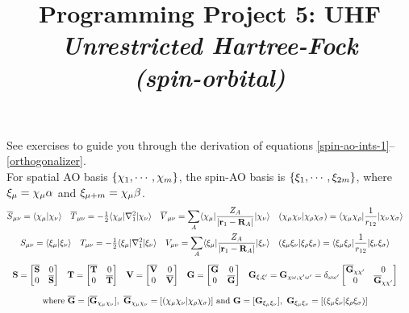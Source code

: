 \documentclass[fleqn]{article}
\title{Programming Project 5: UHF\\
\textit{Unrestricted Hartree-Fock\\(spin-orbital)}}
\author{}
\date{}
\begin{document}
\maketitle
\vspace{-1cm}
\noindent
See exercises to guide you through the derivation of equations \ref{spin-ao-ints-1}--\ref{orthogonalizer}.\\

\noindent
{}
For spatial AO basis $\{\chi_1,\cdots,\chi_m\}$, the spin-AO basis is $\{\xi_1,\cdots,\xi_{2m}\}$, where $\xi_\mu=\chi_\mu\alpha$ and $\xi_{\mu+m}=\chi_\mu\beta$.
\begin{gather}
\begin{aligned}
\label{space-ao-ints}
&
  \overline{S}_{\mu\nu}
=
  \langle\chi_{\mu}|\chi_{\nu}\rangle
&&
  \overline{T}_{\mu\nu}
=
  -\tfrac{1}{2}\langle\chi_{\mu}|\nabla_1^2|\chi_{\nu}\rangle
&&
  \overline{V}_{\mu\nu}
=
  \sum_A\langle\chi_{\mu}|\dfrac{Z_A}{|\mathbf{r}_1-\mathbf{R}_A|}|\chi_{\nu}\rangle
&&
  (\chi_\mu\chi_\nu|\chi_\rho\chi_\sigma)
=
  \langle\chi_\mu\chi_\rho|\dfrac{1}{r_{12}}|\chi_\nu\chi_\sigma\rangle
\end{aligned}\\
\begin{aligned}
\label{spin-ao-ints}
&
  S_{\mu\nu}
=
  \langle\xi_{\mu}|\xi_{\nu}\rangle
&&
  T_{\mu\nu}
=
  -\tfrac{1}{2}\langle\xi_{\mu}|\nabla_1^2|\xi_{\nu}\rangle
&&
  V_{\mu\nu}
=
  \sum_A\langle\xi_{\mu}|\dfrac{Z_A}{|\mathbf{r}_1-\mathbf{R}_A|}|\xi_{\nu}\rangle
&&
  (\xi_\mu\xi_\nu|\xi_\rho\xi_\sigma)
=
  \langle\xi_\mu\xi_\rho|\dfrac{1}{r_{12}}|\xi_\nu\xi_\sigma\rangle
\end{aligned}\\[5pt]
\begin{aligned}
\label{spin-ao-ints-1}
&
  \mathbf{S}
=
  \begin{bmatrix}\overline{\mathbf{S}}&0\\0&\overline{\mathbf{S}}\end{bmatrix}
&&
  \mathbf{T}
=
  \begin{bmatrix}\overline{\mathbf{T}}&0\\0&\overline{\mathbf{T}}\end{bmatrix}
&&
  \mathbf{V}
=
  \begin{bmatrix}\overline{\mathbf{V}}&0\\0&\overline{\mathbf{V}}\end{bmatrix}
&&
  \mathbf{G}
=
  \begin{bmatrix}\overline{\mathbf{G}}&0\\0&\overline{\mathbf{G}}\end{bmatrix}
&&
  \mathbf{G}_{\xi,\xi'}
=
  \mathbf{G}_{\chi\omega,\chi'\omega'}
=
  \delta_{\omega\omega'}
  \begin{bmatrix}\overline{\mathbf{G}}_{\chi\chi'}&0\\0&\overline{\mathbf{G}}_{\chi\chi'}\end{bmatrix}
\end{aligned}\\[7pt]
\begin{aligned}
\label{spin-ao-ints-2}
&
\text{where}
\
  \overline{\mathbf{G}}
=
  [\overline{\mathbf{G}}_{\chi_\mu\chi_\nu}],
\
  \overline{\mathbf{G}}_{\chi_\mu\chi_\nu}
=
  [(\chi_\mu\chi_\nu|\chi_\rho\chi_\sigma)]
\
\text{and}
\
  \mathbf{G}
=
  [\mathbf{G}_{\xi_\mu\xi_\nu}],
\
  \mathbf{G}_{\xi_\mu\xi_\nu}
=
  [(\xi_\mu\xi_\nu|\xi_\rho\xi_\sigma)]
\end{aligned}
\end{gather}
\end{document}
